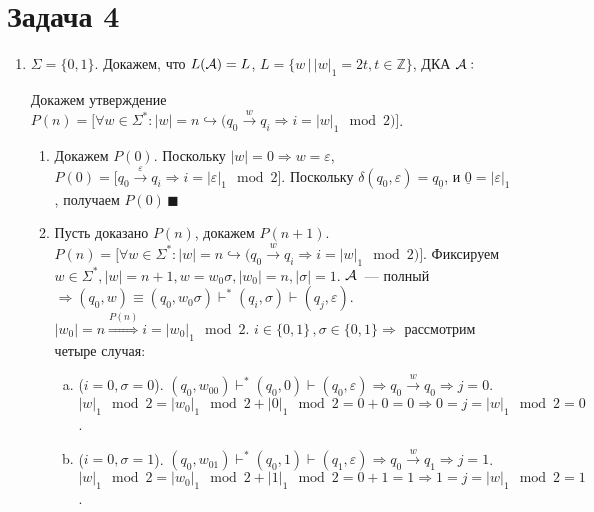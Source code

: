 \documentclass[a4paper]{article}
\def\A{{\cal A}}
\begin{document}
\section*{Задача 4}
\begin{enumerate}
\item $\Sigma=\{0,1\}$. Докажем, что $L(\A)=L$, $L=\{w\,\big|\,|w|_1=2t,t\in{\mathbb Z}\}$, ДКА $\A:$
\begin{center}
\begin{center}
\end{center}
\end{center}
Докажем утверждение $P(n)=\big[\forall w\in\Sigma^*\colon |w|=n\hookrightarrow \big(q_0\overset{w}{\longrightarrow}q_i\Rightarrow i=|w|_1\mod 2\big)\big]$.
\begin{enumerate}
\item Докажем $P(0)$. Поскольку $|w|=0\Rightarrow w=\varepsilon$, $P(0)=\big[q_0\overset{\varepsilon}{\longrightarrow}q_i\Rightarrow i=|\varepsilon|_1\mod 2\big]$. Поскольку $\delta(q_0,\varepsilon)=q_{\underline{0}}$, и $\underline{0}=|\varepsilon|_1$, получаем $P(0)\,\blacksquare$
\item Пусть доказано $P(n)$, докажем $P(n+1)$. $P(n)=\big[\forall w\in\Sigma^*\colon |w|=n\hookrightarrow \big(q_0\overset{w}{\longrightarrow}q_i\Rightarrow i=|w|_1\mod 2\big)\big]$. Фиксируем $w\in\Sigma^*,|w|=n+1,w=w_0\sigma,|w_0|=n,|\sigma|=1$. $\A$~--- полный $\Rightarrow(q_0,w)\equiv(q_0,w_0\sigma)\vdash^*(q_i,\sigma)\vdash(q_j,\varepsilon)$. $|w_0|=n\overset{P(n)}{\Rightarrow}i=|w_0|_1\mod 2$. $i\in\{0,1\}\,,\sigma\in\{0,1\}\Rightarrow$ рассмотрим четыре случая:
\begin{enumerate}[a.]
\item ($i=0,\sigma=0$). $(q_0,w_00)\vdash^*(q_0,0)\vdash(q_0,\varepsilon)\Rightarrow q_0\overset{w}{\longrightarrow}q_0\Rightarrow j=0$. $|w|_1\mod 2=|w_0|_1\mod 2+|0|_1\mod 2=0+0=0\Rightarrow 0=j=|w|_1\mod 2=0$.
\item ($i=0,\sigma=1$). $(q_0,w_01)\vdash^*(q_0,1)\vdash(q_1,\varepsilon)\Rightarrow q_0\overset{w}{\longrightarrow}q_1\Rightarrow j=1$. $|w|_1\mod 2=|w_0|_1\mod 2+|1|_1\mod 2=0+1=1\Rightarrow 1=j=|w|_1\mod 2=1$.

\end{enumerate}
\end{enumerate}
\end{enumerate}
\end{document}
